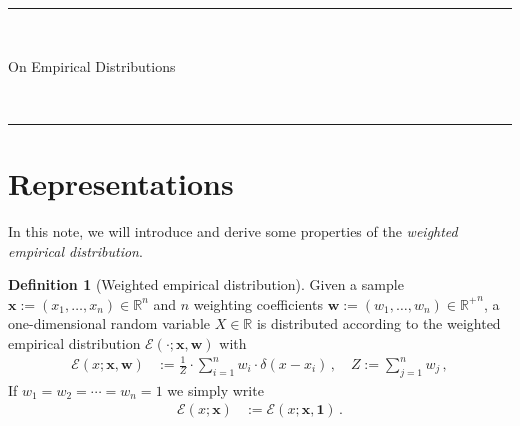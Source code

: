 \documentclass[a4paper]{article}
\newcommand{\Real}{{\mathbb R}}
\newcommand{\WeightedEmpirical}[3]{{\mathcal E} \left({#1};{#2},{#3}\right)}
\newcommand{\Empirical}[2]{{\mathcal E} \left({#1}; {#2}\right)}
\newcommand{\dirac}[1]{{\delta \left( {#1} \right)}}
\newcommand{\bs}[1]{\boldsymbol{#1}}
\theoremstyle{definition}
\newtheorem{definition}{Definition}
\begin{document}
\fancyhead[C]{}
\hrule \medskip
\begin{minipage}{0.295\textwidth}
    \raggedright
    \hfill\\
\end{minipage}
\begin{minipage}{0.4\textwidth}
    \centering
    \large
    On Empirical Distributions\\
\end{minipage}
\begin{minipage}{0.295\textwidth}
    \raggedleft
    \hfill\\
\end{minipage}
\medskip\hrule
\bigskip
 
\section*{Representations}
In this note, we will introduce and derive some properties of the {\em weighted empirical distribution}.
\begin{definition}[Weighted empirical distribution]
    Given a sample $\bs{x} := \left(x_1, \ldots, x_n\right) \in \Real^n$ and $n$ weighting coefficients $\bs{w} := \left(w_1, \ldots, w_n\right) \in {\Real^+}^n$, a one-dimensional random variable $X \in \Real$ is distributed according to the weighted empirical distribution $\WeightedEmpirical{\cdot}{\bs{x}}{\bs{w}}$ with
    \begin{align}
        \WeightedEmpirical{x}{\bs{x}}{\bs{w}} & := \frac{1}{Z} \cdot \sum_{i=1}^n w_i \cdot \dirac{x - x_i} \,, \quad Z := \sum_{j=1}^n w_j \,, \label{eq:weighted_empirical_definition} 
    \end{align}
    If $w_1 = w_2 = \cdots = w_n = 1$ we simply write 
    \begin{align}
        \Empirical{x}{\bs{x}} & := \WeightedEmpirical{x}{\bs{x}}{\bs{1}} \,.
    \end{align}
\end{definition}
\end{document}
